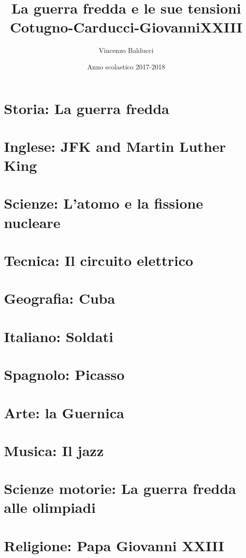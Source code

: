 \documentclass[12pt]{report}
\title{
  {La guerra fredda e le sue tensioni}\\
  {\large Cotugno-Carducci-GiovanniXXIII}
}
\author{Vincenzo Balducci}
\date{Anno scolastico 2017-2018}
\begin{document}
\maketitle

\tableofcontents

\chapter{Storia: La guerra fredda}


\chapter{Inglese: JFK and Martin Luther King}


\chapter{Scienze: L'atomo e la fissione nucleare}


\chapter{Tecnica: Il circuito elettrico}


\chapter{Geografia: Cuba}


\chapter{Italiano: Soldati}


\chapter{Spagnolo: Picasso}


\chapter{Arte: la Guernica}


\chapter{Musica: Il jazz}


\chapter{Scienze motorie: La guerra fredda alle olimpiadi}


\chapter{Religione: Papa Giovanni XXIII}

\end{document}
